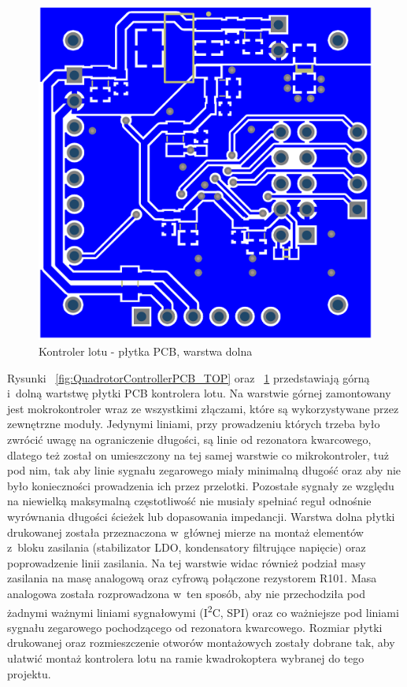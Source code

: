 \documentclass[11pt, twoside]{Thesis} %
\begin{document}
\begin{figure}[H]
	\centering
	\includegraphics[scale=0.24]{Pictures/QuadrotorControllerPCB_Bottom.png}
		\caption[Kontroler lotu - płytka PCB, warstrwa dolna]{Kontroler lotu - płytka PCB, warstwa dolna}
	\label{fig:QuadrotorControllerPCB_Bottom}
\end{figure}

Rysunki ~\ref{fig:QuadrotorControllerPCB_TOP} oraz ~\ref{fig:QuadrotorControllerPCB_Bottom} przedstawiają górną i~dolną wartstwę płytki PCB kontrolera lotu. Na warstwie górnej zamontowany jest mokrokontroler wraz ze wszystkimi złączami, które są wykorzystywane przez zewnętrzne moduły. Jedynymi liniami, przy prowadzeniu których trzeba było zwrócić uwagę na ograniczenie długości, są linie od rezonatora kwarcowego, dlatego też został on umieszczony na tej samej warstwie co mikrokontroler, tuż pod nim, tak aby linie sygnału zegarowego miały minimalną długość oraz aby nie było konieczności prowadzenia ich przez przelotki. Pozostałe sygnały ze względu na niewielką maksymalną częstotliwość nie musiały spełniać reguł odnośnie wyrównania długości ścieżek lub dopasowania impedancji. Warstwa dolna płytki drukowanej została przeznaczona w~głównej mierze na montaż elementów z~bloku zasilania (stabilizator LDO, kondensatory filtrujące napięcie) oraz poprowadzenie linii zasilania. Na tej warstwie widac również podział masy zasilania na masę analogową oraz cyfrową połączone rezystorem R101. Masa analogowa została rozprowadzona w~ten sposób, aby nie przechodziła pod żadnymi ważnymi liniami sygnałowymi (I\textsuperscript{2}C, SPI) oraz co ważniejsze pod liniami sygnału zegarowego pochodzącego od rezonatora kwarcowego. Rozmiar płytki drukowanej oraz rozmieszczenie otworów montażowych zostały dobrane tak, aby ułatwić montaż kontrolera lotu na ramie kwadrokoptera wybranej do tego projektu.
\end{document}
